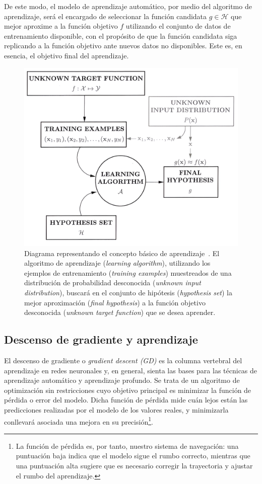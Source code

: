De este modo, el modelo de aprendizaje automático, por medio del algoritmo de aprendizaje, será el encargado de seleccionar la función candidata $g \in \mathcal{H}$ que mejor aproxime a la función objetivo $f$ utilizando el conjunto de datos de entrenamiento disponible, con el propósito de que la función candidata siga replicando a la función objetivo ante nuevos datos no disponibles. Este es, en esencia, el objetivo final del aprendizaje.

\begin{figure}[h]
    \centering
    \includegraphics[width=0.7\linewidth]{img/learning-diagram.png}
    \caption[Diagrama representando el concepto básico de aprendizaje.]{Diagrama representando el concepto básico de aprendizaje~\cite{Mostafa2012}. El algoritmo de aprendizaje (\textit{learning algorithm}), utilizando los ejemplos de entrenamiento (\textit{training examples}) muestreados de una distribución de probabilidad desconocida (\textit{unknown input distribution}), buscará en el conjunto de hipótesis (\textit{hypothesis set}) la mejor aproximación (\textit{final hypothesis}) a la función objetivo desconocida (\textit{unknown target function}) que se desea aprender.}\label{fig:learning-diagram}
\end{figure}

\subsection{Descenso de gradiente y aprendizaje}\label{subsec:descenso-gradiente}

El descenso de gradiente o \emph{gradient descent (GD)} es la columna vertebral del aprendizaje en redes neuronales y, en general, sienta las bases para las técnicas de aprendizaje automático y aprendizaje profundo. Se trata de un algoritmo de optimización sin restricciones cuyo objetivo principal es minimizar la función de pérdida o error del modelo. Dicha función de pérdida mide cuán lejos están las predicciones realizadas por el modelo de los valores reales, y minimizarla conllevará asociada una mejora en su precisión\footnote{La función de pérdida es, por tanto, nuestro sistema de navegación: una puntuación baja indica que el modelo sigue el rumbo correcto, mientras que una puntuación alta sugiere que es necesario corregir la trayectoria y ajustar el rumbo del aprendizaje.}.

